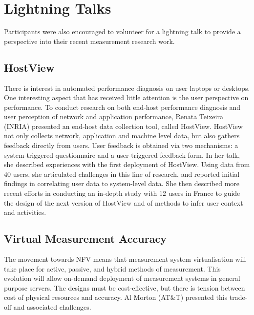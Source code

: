 \section{Lightning Talks}\label{sec:lightning-talks}

Participants were also encouraged to volunteer for a lightning talk to provide
a perspective into their recent measurement research work.

\subsection{HostView}

There is interest in automated performance diagnosis on user laptops or
desktops. One interesting aspect that has received little attention is the
user perspective on performance. To conduct research on both end-host
performance diagnosis and user perception of network and application
performance, Renata Teixeira (INRIA) presented an end-host data collection
tool, called HostView. HostView \cite{rteixeira:pam:2012} not only collects
network, application and machine level data, but also gathers feedback
directly from users. User feedback is obtained via two mechanisms: a
system-triggered questionnaire and a user-triggered feedback form. In her
talk, she described experiences with the first deployment of HostView. Using
data from 40 users, she articulated challenges in this line of research, and
reported initial findings in correlating user data to system-level data. She
then described more recent efforts in conducting an in-depth study with 12
users in France to guide the design of the next version of HostView and of
methods to infer user context and activities.

\subsection{Virtual Measurement Accuracy}

The movement towards \ac{NFV} means that measurement system virtualisation
will take place for active, passive, and hybrid methods of measurement. This
evolution will allow on-demand deployment of measurement systems in general
purpose servers. The designs must be cost-effective, but there is tension
between cost of physical resources and accuracy.  Al Morton (AT\&T) presented
this trade-off and associated challenges.

